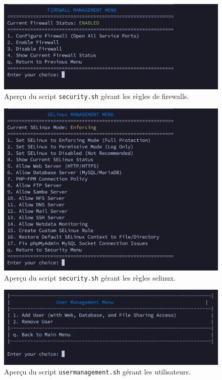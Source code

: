 \documentclass[a4paper,12pt]{article}
\begin{document}
\begin{figure}[H]
    \centering
    \includegraphics[width=\textwidth]{firewall.png}
    \caption{Aperçu du script \texttt{security.sh} gérant les règles de firewalls.}
    \label{fig:script-firewall}
\end{figure}

\begin{figure}[H]
    \centering
    \includegraphics[width=\textwidth]{selinux.png}
    \caption{Aperçu du script \texttt{security.sh} gérant les règles selinux.}
    \label{fig:script-selinux}
\end{figure}

\begin{figure}[H]
    \centering
    \includegraphics[width=\textwidth]{users.png}
    \caption{Aperçu du script \texttt{usermanagement.sh} gérant les utilisateurs.}
    \label{fig:script-usermanagement}
\end{figure}
\end{document}
